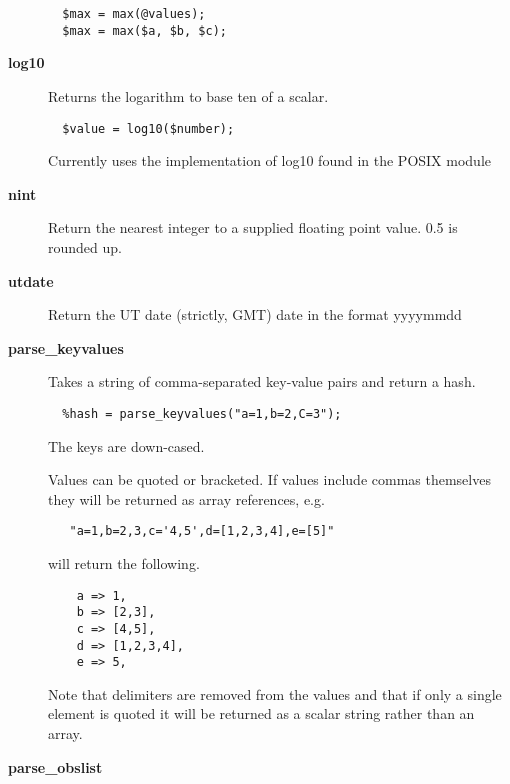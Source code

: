 \begin{description}
\begin{verbatim}
  $max = max(@values);
  $max = max($a, $b, $c);
\end{verbatim}

\item[{\textbf{log10}}] \mbox{}

Returns the logarithm to base ten of a scalar.

\begin{verbatim}
  $value = log10($number);
\end{verbatim}


Currently uses the implementation of log10 found in the
POSIX module


\item[{\textbf{nint}}] \mbox{}

Return the nearest integer to a supplied floating point
value. 0.5 is rounded up.


\item[{\textbf{utdate}}] \mbox{}

Return the UT date (strictly, GMT) date in the format yyyymmdd


\item[{\textbf{parse\_keyvalues}}] \mbox{}

Takes a string of comma-separated key-value pairs and return a hash.

\begin{verbatim}
  %hash = parse_keyvalues("a=1,b=2,C=3");
\end{verbatim}


The keys are down-cased.



Values can be quoted or bracketed. If values include commas themselves
they will be returned as array references, e.g.

\begin{verbatim}
   "a=1,b=2,3,c='4,5',d=[1,2,3,4],e=[5]"
\end{verbatim}


will return the following.

\begin{verbatim}
    a => 1,
    b => [2,3],
    c => [4,5],
    d => [1,2,3,4],
    e => 5,
\end{verbatim}


Note that delimiters are removed from the values and that if only a
single element is quoted it will be returned as a scalar string rather
than an array.


\item[{\textbf{parse\_obslist}}] \mbox{}


\end{description}
